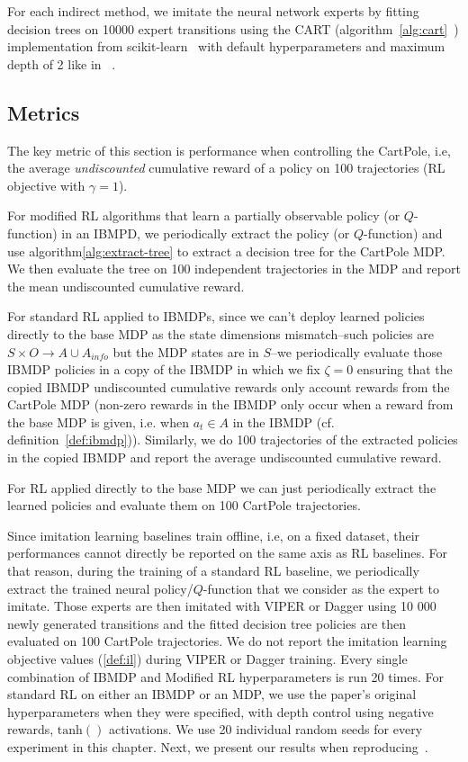 For each indirect method, we imitate the neural network experts by fitting decision trees on 10000 expert transitions using the CART (algorithm~\ref{alg:cart}~\cite{breiman1984classification}) implementation from scikit-learn~\cite{scikit-learn} with default hyperparameters and maximum depth of 2 like in ~\cite{topin2021iterative}.
    
\subsection{Metrics}
The key metric of this section is performance when controlling the CartPole, i.e, the average \textit{undiscounted} cumulative reward of a policy on 100 trajectories (RL objective with $\gamma=1$).

For modified RL algorithms that learn a partially observable policy (or $Q$-function) in an IBMPD, we periodically extract the policy (or $Q$-function) and use algorithm\ref{alg:extract-tree} to extract a decision tree for the CartPole MDP. 
We then evaluate the tree on 100 independent trajectories in the MDP and report the mean undiscounted cumulative reward.

For standard RL applied to IBMDPs, since we can't deploy learned policies directly to the base MDP as the state dimensions mismatch--such policies are $S\times O\rightarrow A \cup A_{info}$ but the MDP states are in $S$--we periodically evaluate those IBMDP policies in a copy of the IBMDP in which we fix $\zeta=0$ ensuring that the copied IBMDP undiscounted cumulative rewards only account rewards from the CartPole MDP (non-zero rewards in the IBMDP only occur when a reward from the base MDP is given, i.e. when $a_t\in A$ in the IBMDP (cf. definition~\ref{def:ibmdp})).
Similarly, we do 100 trajectories of the extracted policies in the copied IBMDP and report the average undiscounted cumulative reward.

For RL applied directly to the base MDP we can just periodically extract the learned policies and evaluate them on 100 CartPole trajectories.

Since imitation learning baselines train offline, i.e, on a fixed dataset, their performances cannot directly be reported on the same axis as RL baselines.
For that reason, during the training of a standard RL baseline, we periodically extract the trained neural policy/$Q$-function that we consider as the expert to imitate.
Those experts are then imitated with VIPER or Dagger using 10 000 newly generated transitions and the fitted decision tree policies are then evaluated on 100 CartPole trajectories.
We do not report the imitation learning objective values (\ref{def:il}) during VIPER or Dagger training.
Every single combination of IBMDP and Modified RL hyperparameters is run 20 times.
For standard RL on either an IBMDP or an MDP, we use the paper's original hyperparameters when they were specified, with depth control using negative rewards, $\operatorname{tanh()}$ activations.
We use 20 individual random seeds for every experiment in this chapter.
Next, we present our results when reproducing~\cite[Table 1]{topin2021iterative}.

